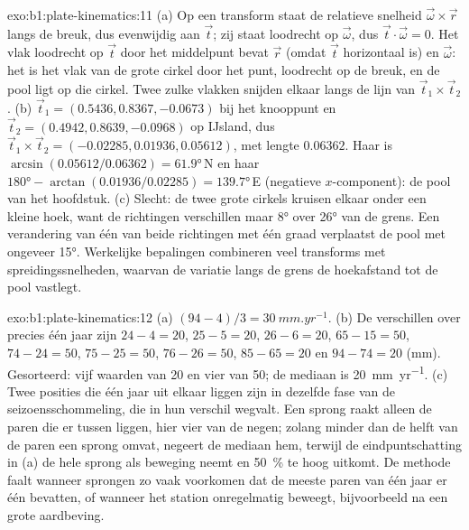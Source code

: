 \begin{solution}{exo:b1:plate-kinematics:11}
(a) Op een transform staat de relatieve snelheid $\vec\omega\times\vec r$ langs de breuk, dus evenwijdig aan $\vec t$; zij staat loodrecht op $\vec\omega$, dus $\vec t\cdot\vec\omega = 0$. Het vlak loodrecht op $\vec t$ door het middelpunt bevat $\vec r$ (omdat $\vec t$ horizontaal is) en $\vec\omega$: het is het vlak van de grote cirkel door het punt, loodrecht op de breuk, en de pool ligt op die cirkel. Twee zulke vlakken snijden elkaar langs de lijn van $\vec t_1\times\vec t_2$. (b) $\vec t_1 = (0.5436, 0.8367, -0.0673)$ bij het knooppunt en $\vec t_2 = (0.4942, 0.8639, -0.0968)$ op IJsland, dus
$\vec t_1\times\vec t_2 = (-0.02285, 0.01936, 0.05612)$, met lengte $0.06362$.
Haar  is $\arcsin(0.05612/0.06362) = \ang{61.9}$\,N en haar  $\ang{180} - \arctan(0.01936/0.02285) = \ang{139.7}$\,E (negatieve $x$-component): de pool van het hoofdstuk. (c) Slecht: de twee grote cirkels kruisen elkaar onder een kleine hoek, want de richtingen verschillen maar \ang{8} over \ang{26} van de grens. Een verandering van één van beide richtingen met één graad verplaatst de pool met ongeveer \ang{15}. Werkelijke bepalingen combineren veel transforms met spreidingssnelheden, waarvan de variatie langs de grens de hoekafstand tot de pool vastlegt.
\end{solution}

\begin{solution}{exo:b1:plate-kinematics:12}
(a) $(94 - 4)/3 = \qty{30}{mm.yr^{-1}}$. (b) De verschillen over precies één jaar zijn
$24 - 4 = 20$, $25 - 5 = 20$, $26 - 6 = 20$, $65 - 15 = 50$, $74 - 24 = 50$,
$75 - 25 = 50$, $76 - 26 = 50$, $85 - 65 = 20$ en $94 - 74 = 20$ (mm). Gesorteerd:
vijf waarden van 20 en vier van 50; de mediaan is \qty{20}{mm.yr^{-1}}. (c) Twee posities die één jaar uit elkaar liggen zijn in dezelfde fase van de seizoensschommeling, die in hun verschil wegvalt. Een sprong raakt alleen de paren die er tussen liggen, hier vier van de negen; zolang minder dan de helft van de paren een sprong omvat, negeert de mediaan hem, terwijl de eindpuntschatting in (a) de hele sprong als beweging neemt en \qty{50}{\percent} te hoog uitkomt. De methode faalt wanneer sprongen zo vaak voorkomen dat de meeste paren van één jaar er één bevatten, of wanneer het station onregelmatig beweegt, bijvoorbeeld na een grote aardbeving.
\end{solution}

